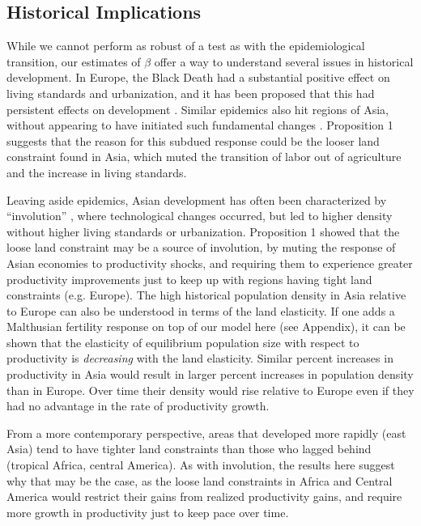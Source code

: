 \subsection{Historical Implications}
While we cannot perform as robust of a test as with the epidemiological transition, our estimates of $\beta$ offer a way to understand several issues in historical development. In Europe, the Black Death had a substantial positive effect on living standards and urbanization, and it has been proposed that this had persistent effects on development \citep{vv08,vv13}. Similar epidemics also hit regions of Asia, without appearing to have initiated such fundamental changes \citep{McNeill1976}. Proposition 1 suggests that the reason for this subdued response could be the looser land constraint found in Asia, which muted the transition of labor out of agriculture and the increase in living standards. 

Leaving aside epidemics, Asian development has often been characterized by ``involution'' \citep{Geertz1963,Huang1990,huang2002}, where technological changes occurred, but led to higher density without higher living standards or urbanization. Proposition 1 showed that the loose land constraint may be a source of involution, by muting the response of Asian economies to productivity shocks, and requiring them to experience greater productivity improvements just to keep up with regions having tight land constraints (e.g. Europe). The high historical population density in Asia relative to Europe can also be understood in terms of the land elasticity. If one adds a Malthusian fertility response on top of our model here (see Appendix), it can be shown that the elasticity of equilibrium population size with respect to productivity is \textit{decreasing} with the land elasticity. Similar percent increases in productivity in Asia would result in larger percent increases in population density than in Europe. Over time their density would rise relative to Europe even if they had no advantage in the rate of productivity growth.

From a more contemporary perspective, areas that developed more rapidly (east Asia) tend to have tighter land constraints than those who lagged behind (tropical Africa, central America). As with involution, the results here suggest why that may be the case, as the loose land constraints in Africa and Central America would restrict their gains from realized productivity gains, and require more growth in productivity just to keep pace over time. 



